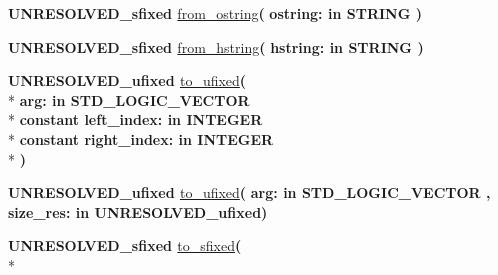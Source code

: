 \begin{DoxyCompactItemize}
\item 
{\bfseries {\bfseries \textcolor{vhdlchar}{U\+N\+R\+E\+S\+O\+L\+V\+E\+D\+\_\+sfixed}\textcolor{vhdlchar}{ }}} \hyperlink{class__fixed__pkg_a7a4d6a9ab321855319dec0480a51ddbd}{from\+\_\+ostring}{\bfseries  ( }{\bfseries \textcolor{vhdlchar}{ostring\+: }\textcolor{stringliteral}{in }{\bfseries \textcolor{comment}{S\+T\+R\+I\+N\+G}\textcolor{vhdlchar}{ }}}{\bfseries  )} 
\item 
{\bfseries {\bfseries \textcolor{vhdlchar}{U\+N\+R\+E\+S\+O\+L\+V\+E\+D\+\_\+sfixed}\textcolor{vhdlchar}{ }}} \hyperlink{class__fixed__pkg_ad3909655b61442d0dc32b3ea5d91af4d}{from\+\_\+hstring}{\bfseries  ( }{\bfseries \textcolor{vhdlchar}{hstring\+: }\textcolor{stringliteral}{in }{\bfseries \textcolor{comment}{S\+T\+R\+I\+N\+G}\textcolor{vhdlchar}{ }}}{\bfseries  )} 
\item 
{\bfseries {\bfseries \textcolor{vhdlchar}{U\+N\+R\+E\+S\+O\+L\+V\+E\+D\+\_\+ufixed}\textcolor{vhdlchar}{ }}} \hyperlink{class__fixed__pkg_ae9cf50571e74e38ef01f8a47789c29fc}{to\+\_\+ufixed}{\bfseries  ( }\\*
{\bfseries \textcolor{vhdlchar}{arg\+: }\textcolor{stringliteral}{in }{\bfseries \textcolor{comment}{S\+T\+D\+\_\+\+L\+O\+G\+I\+C\+\_\+\+V\+E\+C\+T\+O\+R}\textcolor{vhdlchar}{ }}}\\*
{\bfseries {\bfseries \textcolor{keywordflow}{constant}\textcolor{vhdlchar}{ }}\textcolor{vhdlchar}{left\+\_\+index\+: }\textcolor{stringliteral}{in }{\bfseries \textcolor{comment}{I\+N\+T\+E\+G\+E\+R}\textcolor{vhdlchar}{ }}}\\*
{\bfseries {\bfseries \textcolor{keywordflow}{constant}\textcolor{vhdlchar}{ }}\textcolor{vhdlchar}{right\+\_\+index\+: }\textcolor{stringliteral}{in }{\bfseries \textcolor{comment}{I\+N\+T\+E\+G\+E\+R}\textcolor{vhdlchar}{ }}}\\*
{\bfseries  )} 
\item 
{\bfseries {\bfseries \textcolor{vhdlchar}{U\+N\+R\+E\+S\+O\+L\+V\+E\+D\+\_\+ufixed}\textcolor{vhdlchar}{ }}} \hyperlink{class__fixed__pkg_af26dc87215f262aaa602a93f0fc9c123}{to\+\_\+ufixed}{\bfseries  ( }{\bfseries \textcolor{vhdlchar}{arg\+: }\textcolor{stringliteral}{in }{\bfseries \textcolor{comment}{S\+T\+D\+\_\+\+L\+O\+G\+I\+C\+\_\+\+V\+E\+C\+T\+O\+R}\textcolor{vhdlchar}{ }}}{\bfseries  , \textcolor{vhdlchar}{size\+\_\+res\+: }\textcolor{stringliteral}{in }\textcolor{vhdlchar}{U\+N\+R\+E\+S\+O\+L\+V\+E\+D\+\_\+ufixed}}{\bfseries  )} 
\item 
{\bfseries {\bfseries \textcolor{vhdlchar}{U\+N\+R\+E\+S\+O\+L\+V\+E\+D\+\_\+sfixed}\textcolor{vhdlchar}{ }}} \hyperlink{class__fixed__pkg_af46256039c7dcae5645c9522a0d7a78f}{to\+\_\+sfixed}{\bfseries  ( }\\*

\end{DoxyCompactItemize}
